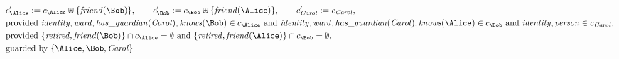 \begin{align*}
&
c'_
{
\Alice
}
 := 
c_
{
\Alice
}
 \uplus 
\{
\mathit{\detokenize{
friend
}}
(
\Bob
)
\}
, \qquad 
c'_
{
\Bob
}
 := 
c_
{
\Bob
}
 \uplus 
\{
\mathit{\detokenize{
friend
}}
(
\Alice
)
\}
, \qquad 
c'_
{
\mathit{Carol}
}
 := 
c_
{
\mathit{Carol}
}
,\\
&
\text{provided } 
\mathit{\detokenize{
identity
}}
,
\mathit{\detokenize{
ward
}}
,
\mathit{\detokenize{
has_guardian
}}
(
\mathit{Carol}
)
,
\mathit{\detokenize{
knows
}}
(
\Bob
)
 \in c_
{
\Alice
}
 \text{ and } 
\mathit{\detokenize{
identity
}}
,
\mathit{\detokenize{
ward
}}
,
\mathit{\detokenize{
has_guardian
}}
(
\mathit{Carol}
)
,
\mathit{\detokenize{
knows
}}
(
\Alice
)
 \in c_
{
\Bob
}
 \text{ and } 
\mathit{\detokenize{
identity
}}
,
\mathit{\detokenize{
person
}}
 \in c_
{
\mathit{Carol}
}
,\\
&
\text{provided } 
\{
\mathit{\detokenize{
retired
}}
,
\mathit{\detokenize{
friend
}}
(
\Bob
)
\}
 \cap c_
{
\Alice
}
 = \emptyset
 \text{ and } 
\{
\mathit{\detokenize{
retired
}}
,
\mathit{\detokenize{
friend
}}
(
\Alice
)
\}
 \cap c_
{
\Bob
}
 = \emptyset
,\\
&
\text{guarded by } \{
\Alice
,
\Bob
,
\mathit{Carol}
\}
\end{align*}

